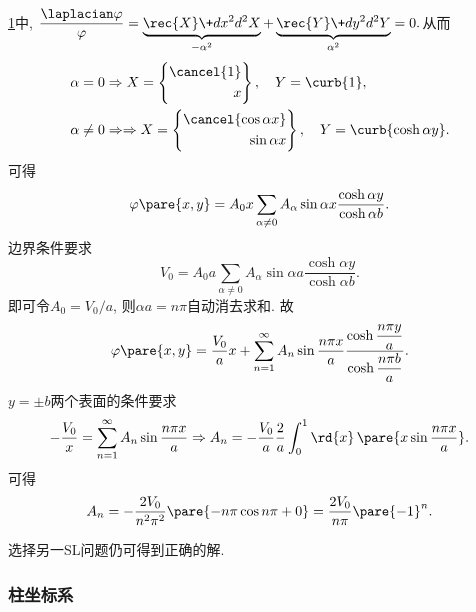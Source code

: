 \documentclass[hidelinks]{ctexart}
\begin{document}
\begin{figure}[ht]
    \centering
    \caption{}
    \label{fig:方管laplacian}
\end{figure}
\begin{sample}
    \begin{ex}
        \cref{fig:方管laplacian}中, $\displaystyle \frac{\laplacian\varphi}{\varphi} = \underbrace{\rec{X}\+d{x^2}d{^2X}}_{-\alpha^2} + \underbrace{\rec{Y}\+d{y^2}d{^2Y}}_{\alpha^2} = 0.$从而
        \begin{align*}
            \alpha = 0 & \Rightarrow X = \left\{\begin{aligned}
                \cancel{1} \\ x
                \end{aligned} \right\},\quad Y = \curb{1}, \\
            \alpha \neq 0 & \Rightarrow \Rightarrow X = \left\{\begin{aligned}
                \cancel{\cos \alpha x} \\ \sin \alpha x
                \end{aligned} \right\},\quad Y = \curb{\cosh \alpha y}.
        \end{align*}
        可得
        \[ \varphi\pare{x,y} = A_0 x \sum_{\alpha \neq 0} A_\alpha \sin \alpha x \frac{\cosh\alpha y}{\cosh \alpha b}. \]
        边界条件要求
        \[ V_0 = A_0 a \sum_{\alpha \neq 0} A_\alpha \sin \alpha a \frac{\cosh\alpha y}{\cosh \alpha b}. \]
        即可令$\displaystyle A_0 = V_0/a$, 则$\alpha a = n\pi$自动消去求和. 故
        \[ \varphi\pare{x,y} = \frac{V_0}{a}x + \sum_{n=1}^\infty A_n \sin \frac{n\pi x}{a} \frac{\displaystyle \cosh \frac{n\pi y}{a}}{\displaystyle \cosh \frac{n\pi b}{a}}. \]
        $y=\pm b$两个表面的条件要求
        \[ -\frac{V_0}{x} = \sum_{n=1}^\infty A_n \sin\frac{n\pi x}{a} \Rightarrow A_n = - \frac{V_0}{a} \frac{2}{a}\int_0^1\rd{x}\,\pare{x\sin \frac{n\pi x}{a}}. \]
        可得
        \[ A_n = -\frac{2V_0}{n^2\pi^2}\pare{-n\pi \cos n\pi + 0} = \frac{2V_0}{n\pi}\pare{-1}^n. \]
    \end{ex}
    \begin{remark}
        选择另一SL问题仍可得到正确的解.
    \end{remark}
\end{sample}


\subsubsection{柱坐标系} %
\label{ssub:柱坐标系}
\end{document}
